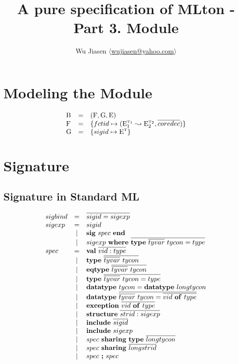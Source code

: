 \documentclass[11pt,a4paper]{article}
\newcommand{\key}[1]{\textrm{\textbf{#1}}}
\newcommand{\sig}       {\key{sig}}
\newcommand{\End}       {\key{end}}
\newcommand{\val}       {\key{val}}
\newcommand{\type}      {\key{type}}
\newcommand{\eqtype}    {\key{eqtype}}
\newcommand{\datatype}  {\key{datatype}}
\newcommand{\exception} {\key{exception}}
\newcommand{\of}        {\key{of}}
\newcommand{\inc}       {\key{include}}
\newcommand{\sharing}   {\key{sharing}}
\newcommand{\where}     {\key{where}}
\newcommand{\Structure} {\key{structure}}
\newcommand{\B}  {\textrm{B}}
\newcommand{\E}  {\textrm{E}}
\newcommand{\sT} {\textrm{\tiny T}}
\renewcommand{\G}{\textrm{G}}
\newcommand{\F}  {\textrm{F}}
\newcommand{\braced}[1]{\{#1\}}
\newcommand{\fctor}[2]{#1 \leadsto #2}
\newcommand{\vect}[1]{\overline{#1}}
\begin{document}
\title {A pure specification of MLton - Part 3. Module}
\author{Wu Jiasen $\langle$\href{mailto:wujiasen@yahoo.com}{wujiasen@yahoo.com}$\rangle$}
\maketitle 
\thispagestyle{fancy}

\section{Modeling the Module}
\[\begin{array}{lcl}
    \B & = & (\F, \G, \E) \\
    \F & = & \braced{fctid \mapsto (\fctor{\E_1^{\sT_1}}{\E_2^{\sT_2}}, \vect{coredec})} \\
    \G & = & \braced{sigid \mapsto \E^\sT} \\
\end{array}\]

\section{Signature}
\subsection {Signature in Standard ML}
{\renewcommand{\arraystretch}{1.2}\[
\begin{array}{lcl}
sigbind
    & = & \overline{sigid = sigexp}                        \\

sigexp 
    & = & sigid \\
    & | & \sig\ spec\ \End  \\
    & | & sigexp\ \where\ \overline{\type\ \overline{tyvar}\ tycon = type} \\
    
spec 
    & = & \val\ \overline{vid : type} \\
    & | & \type\ \overline{\overline{tyvar}\ tycon} \\
    & | & \eqtype\ \overline{\overline{tyvar}\ tycon} \\
    & | & \type\ \overline{\overline{tyvar}\ tycon = type} \\
    & | & \datatype\ tycon = \datatype\ longtycon \\
    & | & \datatype\ \overline{\overline{tyvar}\ tycon = \overline{vid\ \of\ type}} \\
    & | & \exception\ \overline{vid\ \of\ type} \\
    & | & \Structure\ \overline{strid:sigexp} \\
    & | & \inc\ \overline{sigid} \\
    & | & \inc\ sigexp \\
    & | & spec\ \sharing\ \type\ \overline{longtycon} \\
    & | & spec\ \sharing\ \overline{longstrid} \\
    & | & spec\ \key{;}\ spec \\
\end{array}\]}
\end{document}
